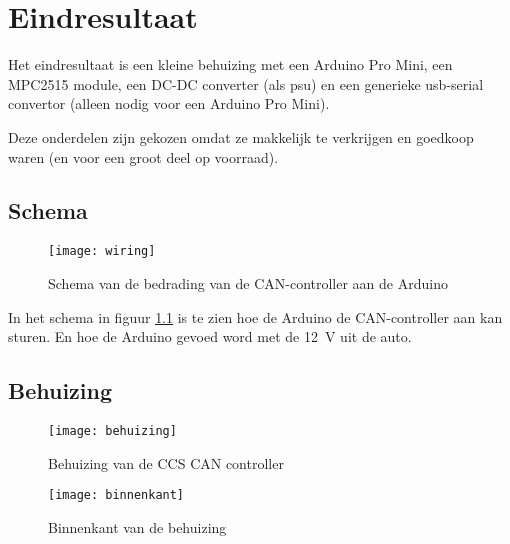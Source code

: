 \chapter{Eindresultaat}
\label{Eindresultaat}

Het eindresultaat is een kleine behuizing met een Arduino Pro Mini, een MPC2515
module, een DC-DC converter (als \ac{psu}) en een generieke \ac{usb}-serial
convertor (alleen nodig voor een Arduino Pro Mini).

Deze onderdelen zijn gekozen omdat ze makkelijk te verkrijgen en goedkoop
waren (en voor een groot deel op voorraad).

\section{Schema}

\begin{figure}[]
    \centering
    \texttt{[image: wiring]}
    \caption{Schema van de bedrading van de CAN-controller aan de Arduino \cite{autowp}}
    \label{fig:wiring}
\end{figure}

In het schema in figuur \ref{fig:wiring} is te zien hoe de Arduino de
CAN-controller aan kan sturen. En hoe de Arduino gevoed word met de
\si{12\volt} uit de auto.

\section{Behuizing}

\begin{figure}[]
    \centering
    \begin{minipage}{0.45\textwidth}
        \centerline{\texttt{[image: behuizing]}}
        \caption{Behuizing van de CCS CAN controller}
        \label{fig:behuizing}
    \end{minipage}\hfill
    \begin{minipage}{0.45\textwidth}
        \centerline{\texttt{[image: binnenkant]}}
        \caption{Binnenkant van de behuizing}
        \label{fig:binnenkant}
    \end{minipage}
\end{figure}

